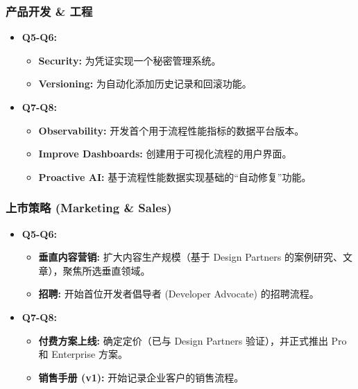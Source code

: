 \documentclass[11pt, a4paper, oneside]{article}
\begin{document}
\subsubsection{产品开发 \& 工程}
\begin{itemize}[leftmargin=*]
    \item \textbf{Q5-Q6:}
    \begin{itemize}
        \item \textbf{Security:} 为凭证实现一个秘密管理系统。
        \item \textbf{Versioning:} 为自动化添加历史记录和回滚功能。
    \end{itemize}
    \item \textbf{Q7-Q8:}
    \begin{itemize}
        \item \textbf{Observability:} 开发首个用于流程性能指标的数据平台版本。
        \item \textbf{Improve Dashboards:} 创建用于可视化流程的用户界面。
        \item \textbf{Proactive AI:} 基于流程性能数据实现基础的“自动修复”功能。
    \end{itemize}
\end{itemize}



\subsubsection{上市策略 (Marketing \& Sales)}
\begin{itemize}[leftmargin=*]
    \item \textbf{Q5-Q6:}
    \begin{itemize}
        \item \textbf{垂直内容营销:} 扩大内容生产规模（基于 Design Partners 的案例研究、文章），聚焦所选垂直领域。
        \item \textbf{招聘:} 开始首位开发者倡导者 (Developer Advocate) 的招聘流程。
    \end{itemize}
    \item \textbf{Q7-Q8:}
    \begin{itemize}
        \item \textbf{付费方案上线:} 确定定价（已与 Design Partners 验证），并正式推出 Pro 和 Enterprise 方案。
        \item \textbf{销售手册 (v1):} 开始记录企业客户的销售流程。
    \end{itemize}
\end{itemize}
\end{document}
